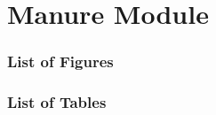 \part{Manure Module}
\thispagestyle{fancy}

\localtableofcontents
\newpage

\section*{List of Figures}
\locallistoffigures
\newpage

\section*{List of Tables}
\locallistoftables
\newpage


